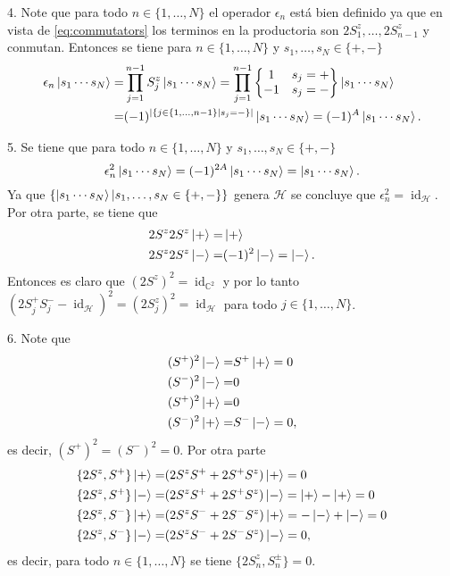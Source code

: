 \documentclass{article}
\DeclareMathOperator{\id}{id}
\begin{document}
4. Note que para todo $n\in\{1,\dots,N\}$ el operador $\epsilon_n$ está bien definido ya que en vista de \eqref{eq:commutators} los terminos en la productoria son $2S_1^z,\dots,2S_{n-1}^z$ y conmutan. Entonces se tiene para $n\in\{1,\dots,N\}$ y $s_1,\dots,s_N\in\{+,-\}$
\begin{align}
\begin{split}
\epsilon_n\ket{s_1\cdots s_N}=&\prod_{j=1}^{n-1}S_j^z\ket{s_1\cdots s_N}=\prod_{j=1}^{n-1}\qty{\mqty{
1 & s_j=+\\
-1 & s_j=-}}\ket{s_1\cdots s_N}\\
=&(-1)^{|\{j\in\{1,\dots,n-1\}|s_j=-\}|}\ket{s_1\cdots s_N}=(-1)^A\ket{s_1\cdots s_N}.
\end{split}
\end{align}

5. Se tiene que para todo $n\in\{1,\dots,N\}$ y $s_1,\dots,s_N\in\{+,-\}$
\begin{equation}\label{eq:idempotencia}
\epsilon_n^2\ket{s_1\cdots s_N}=(-1)^{2A}\ket{s_1\cdots s_N}=\ket{s_1\cdots s_N}.
\end{equation}
Ya que $\{\ket{s_1\cdots s_N}|s_1,\dots,s_N\in\{+,-\}\}$ genera $\mathcal{H}$ se concluye que $\epsilon_n^2=\id_\mathcal{H}$. Por otra parte, se tiene que 
\begin{align}
\begin{split}
2S^z2S^z\ket{+}=&\ket{+}\\
2S^z2S^z\ket{-}=&(-1)^2\ket{-}=\ket{-}.
\end{split}
\end{align}
Entonces es claro que $(2S^z)^2=\id_{\mathbb{C}^2}$ y por lo tanto $(2S^+_jS^-_j-\id_\mathcal{H})^2=(2S^z_j)^2=\id_\mathcal{H}$ para todo $j\in\{1,\dots,N\}$. 

6. Note que
\begin{align}
\begin{split}
(S^+)^2\ket{-}=&S^+\ket{+}=0\\
(S^-)^2\ket{-}=&0\\
(S^+)^2\ket{+}=&0\\
(S^-)^2\ket{+}=&S^-\ket{-}=0,
\end{split}
\end{align}
es decir, $(S^+)^2=(S^-)^2=0$. Por otra parte
\begin{align}
\begin{split}
\{2S^z,S^+\}\ket{+}=&(2S^zS^++2S^+ S^z)\ket{+}=0\\
\{2S^z,S^+\}\ket{-}=&(2S^zS^++2S^+ S^z)\ket{-}=\ket{+}-\ket{+}=0\\
\{2S^z,S^-\}\ket{+}=&(2S^zS^-+2S^- S^z)\ket{+}=-\ket{-}+\ket{-}=0\\
\{2S^z,S^-\}\ket{-}=&(2S^zS^-+2S^- S^z)\ket{-}=0,
\end{split}
\end{align}
es decir, para todo $n\in\{1,\dots,N\}$ se tiene $\{2S_n^z,S_n^\pm\}=0$.
\end{document}
